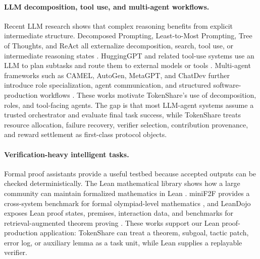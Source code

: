 \documentclass{article}
\theoremstyle{plain}
\begin{document}
\paragraph{LLM decomposition, tool use, and multi-agent workflows.}
Recent LLM research shows that complex reasoning benefits from explicit intermediate structure. Decomposed Prompting, Least-to-Most Prompting, Tree of Thoughts, and ReAct all externalize decomposition, search, tool use, or intermediate reasoning states \citep{khot2023decomposed,zhou2023least,yao2023tree,yao2023react}. HuggingGPT and related tool-use systems use an LLM to plan subtasks and route them to external models or tools \citep{shen2023hugginggpt}. Multi-agent frameworks such as CAMEL, AutoGen, MetaGPT, and ChatDev further introduce role specialization, agent communication, and structured software-production workflows \citep{li2023camel,wu2023autogen,hong2024metagpt,qian2023chatdev}. These works motivate TokenShare's use of decomposition, roles, and tool-facing agents. The gap is that most LLM-agent systems assume a trusted orchestrator and evaluate final task success, while TokenShare treats resource allocation, failure recovery, verifier selection, contribution provenance, and reward settlement as first-class protocol objects.

\paragraph{Verification-heavy intelligent tasks.}
Formal proof assistants provide a useful testbed because accepted outputs can be checked deterministically. The Lean mathematical library shows how a large community can maintain formalized mathematics in Lean \citep{mathlib2020}. miniF2F provides a cross-system benchmark for formal olympiad-level mathematics \citep{zheng2021minif2f}, and LeanDojo exposes Lean proof states, premises, interaction data, and benchmarks for retrieval-augmented theorem proving \citep{yang2023leandojo}. These works support our Lean proof-production application: TokenShare can treat a theorem, subgoal, tactic patch, error log, or auxiliary lemma as a task unit, while Lean supplies a replayable verifier.
\end{document}

